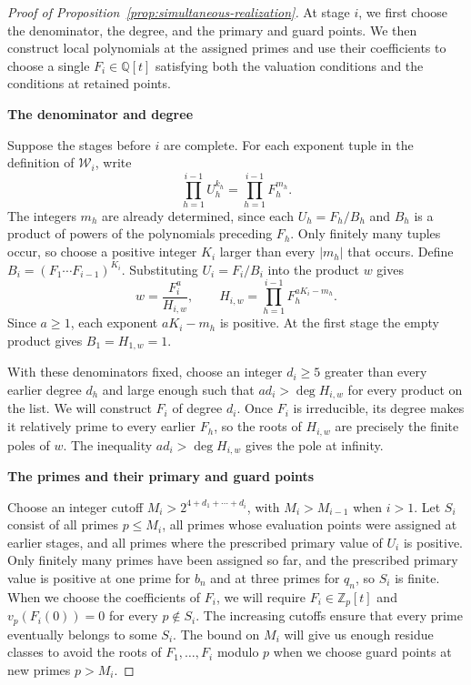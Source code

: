 \documentclass{article}
\newcommand{\proofheading}[1]{%
    \par\addvspace{\smallskipamount}%
    \noindent\textbf{#1}\par\nobreak
}
\theoremstyle{remark}
\begin{document}
\begin{proof}[Proof of Proposition~\ref{prop:simultaneous-realization}]
    At stage $i$, we first choose the denominator, the degree, and the primary and guard points.
    We then construct local polynomials at the assigned primes and use their coefficients to choose a single $F_i \in \mathbb{Q}[t]$ satisfying both the valuation conditions and the conditions at retained points.

    \proofheading{The denominator and degree}
    Suppose the stages before $i$ are complete.
    For each exponent tuple in the definition of $\mathcal{W}_i$, write
    \[
        \prod_{h = 1}^{i - 1} U_h^{k_h} = \prod_{h = 1}^{i - 1} F_h^{m_h}.
    \]
    The integers $m_h$ are already determined, since each $U_h = F_h/B_h$ and $B_h$ is a product of powers of the polynomials preceding $F_h$.
    Only finitely many tuples occur, so choose a positive integer $K_i$ larger than every $|m_h|$ that occurs.
    Define $B_i = (F_1 \cdots F_{i - 1})^{K_i}$.
    Substituting $U_i = F_i/B_i$ into the product $w$ gives
    \[
        w = \frac{F_i^a}{H_{i, w}}, \qquad H_{i, w} = \prod_{h = 1}^{i - 1} F_h^{a K_i - m_h}.
    \]
    Since $a \ge 1$, each exponent $a K_i - m_h$ is positive.
    At the first stage the empty product gives $B_1 = H_{1, w} = 1$.

    With these denominators fixed, choose an integer $d_i \ge 5$ greater than every earlier degree $d_h$ and large enough such that $a d_i > \deg H_{i, w}$ for every product on the list.
    We will construct $F_i$ of degree $d_i$.
    Once $F_i$ is irreducible, its degree makes it relatively prime to every earlier $F_h$, so the roots of $H_{i, w}$ are precisely the finite poles of $w$.
    The inequality $a d_i > \deg H_{i, w}$ gives the pole at infinity.

    \proofheading{The primes and their primary and guard points}
    Choose an integer cutoff $M_i > 2^{4 + d_1 + \cdots + d_i}$, with $M_i > M_{i - 1}$ when $i > 1$.
    Let $S_i$ consist of all primes $p \le M_i$, all primes whose evaluation points were assigned at earlier stages, and all primes where the prescribed primary value of $U_i$ is positive.
    Only finitely many primes have been assigned so far, and the prescribed primary value is positive at one prime for $b_n$ and at three primes for $q_n$, so $S_i$ is finite.
    When we choose the coefficients of $F_i$, we will require $F_i \in \mathbb{Z}_p[t]$ and $v_p(F_i(0)) = 0$ for every $p \notin S_i$.
    The increasing cutoffs ensure that every prime eventually belongs to some $S_i$.
    The bound on $M_i$ will give us enough residue classes to avoid the roots of $F_1, \ldots, F_i$ modulo $p$ when we choose guard points at new primes $p > M_i$.


\end{proof}
\end{document}
